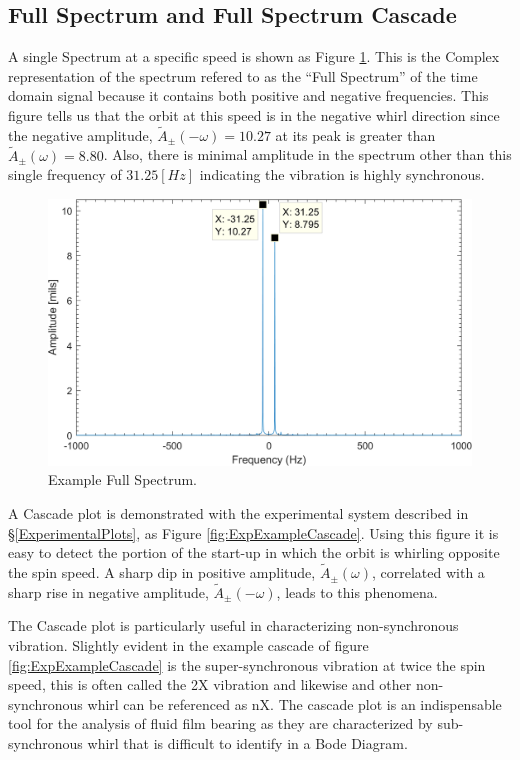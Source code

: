 \subsection{Full Spectrum and Full Spectrum Cascade}
A single Spectrum at a specific speed is shown as Figure \ref{fig:ExpExampleSpectrum}. This is the Complex representation of the spectrum refered to as the ``Full Spectrum'' of the time domain signal because it contains both positive and negative frequencies. This figure tells us that the orbit at this speed is in the negative whirl direction since the negative amplitude, $ \tilde{A}_\pm(-\omega)=10.27 $ at its peak is greater than $ \tilde{A}_\pm(\omega)=8.80 $. Also, there is minimal amplitude in the spectrum other than this single frequency of $ 31.25[Hz] $ indicating the vibration is highly synchronous.
\begin{figure}
	\centering
	\includegraphics[width=\linewidth]{./figures/Images/Figure_8.png}
	\caption{Example Full Spectrum.}
	\label{fig:ExpExampleSpectrum}
\end{figure}
 A Cascade plot is demonstrated with the experimental system described in \S\ref{ExperimentalPlots}, as Figure \ref{fig:ExpExampleCascade}. Using this figure it is easy to detect the portion of the start-up in which the orbit is whirling opposite the spin speed. A sharp dip in positive amplitude, $ \tilde{A}_\pm(\omega) $, correlated with a sharp rise in negative amplitude, $ \tilde{A}_\pm(-\omega) $, leads to this phenomena.\par 
The Cascade plot is particularly useful in characterizing non-synchronous vibration. Slightly evident in the example cascade of figure \ref{fig:ExpExampleCascade} is the super-synchronous vibration at twice the spin speed, this is often called the 2X vibration and likewise and other non-synchronous whirl can be referenced as nX. The cascade plot is an indispensable tool for the analysis of fluid film bearing as they are characterized by sub-synchronous whirl that is difficult to identify in a Bode Diagram.\par 
